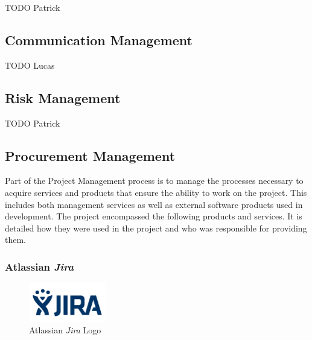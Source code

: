 TODO Patrick



\subsection{Communication Management}
\label{ssec:communication_management}

TODO Lucas



\subsection{Risk Management}
\label{ssec:risk_management}

TODO Patrick



\subsection{Procurement Management}
\label{ssec:procurement_management}

Part of the Project Management process is to manage the processes necessary to acquire services and products that ensure the ability to work on the project. This includes both management services as well as external software products used in development.
\newline
The project encompassed the following products and services. It is detailed how they were used in the project and who was responsible for providing them.

\subsubsection{Atlassian \textit{Jira}}
\label{sssec:jira}

\begin{figure}[H]
    \begin{center}
        \includegraphics[width=0.3\textwidth]{images/logos/jira-logo.png}
        \caption{Atlassian \textit{Jira} Logo}
        \label{fig:jira_logo}
    \end{center}
\end{figure}

